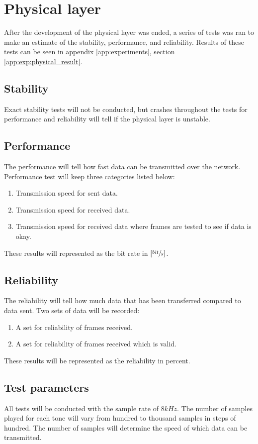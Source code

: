 \section{Physical layer}
After the development of the physical layer was ended, a series of tests was ran to make an estimate of the stability, performance, and reliability. Results of these tests can be seen in appendix \ref{app:experiments}, section \ref{app:exp:physical_result}.

	\subsection{Stability}
	Exact stability tests will not be conducted, but crashes throughout the tests for performance and reliability will tell if the physical layer is unstable.

	\subsection{Performance}
	The performance will tell how fast data can be transmitted over the network. Performance test will keep three categories listed below:
	
	\begin{enumerate}
	\item Transmission speed for sent data.
	\item Transmission speed for received data.
	\item Transmission speed for received data where frames are tested to see if data is okay.
	\end{enumerate}
	These results will represented as the bit rate in $[\sfrac{bit}{s}]$.
	
	\subsection{Reliability}
	The reliability will tell how much data that has been transferred compared to data sent. Two sets of data will be recorded:
	
	\begin{enumerate}
	\item A set for reliability of frames received.
	\item A set for reliability of frames received which is valid.
	\end{enumerate}
	These results will be represented as the reliability in percent.
	
	\subsection{Test parameters}
	All tests will be conducted with the sample rate of $8kHz$. The number of samples played for each tone will vary from hundred to thousand samples in steps of hundred. The number of samples will determine the speed of which data can be transmitted.
	
